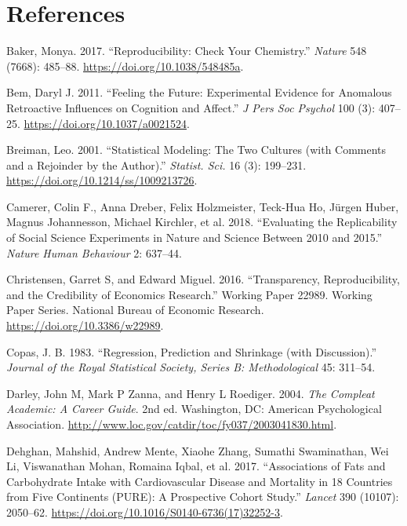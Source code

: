 \documentclass[
  12pt,
]{book}
\newlength{\cslhangindent}
\newlength{\cslentryspacingunit} %
\newenvironment{CSLReferences}[2] %
 {%
  \setlength{\parindent}{0pt}
  \ifodd #1
  \let\oldpar\par
  \def\par{\hangindent=\cslhangindent\oldpar}
  \fi
  \setlength{\parskip}{#2\cslentryspacingunit}
 }%
 {}
\begin{document}
\hypertarget{references}{%
\chapter{References}\label{references}}

\hypertarget{refs}{}
\begin{CSLReferences}{1}{0}
\leavevmode{}%
Baker, Monya. 2017. {``Reproducibility: Check Your Chemistry.''} \emph{Nature} 548 (7668): 485--88. \url{https://doi.org/10.1038/548485a}.

\leavevmode{}%
Bem, Daryl J. 2011. {``Feeling the Future: Experimental Evidence for Anomalous Retroactive Influences on Cognition and Affect.''} \emph{J Pers Soc Psychol} 100 (3): 407--25. \url{https://doi.org/10.1037/a0021524}.

\leavevmode{}%
Breiman, Leo. 2001. {``Statistical Modeling: The Two Cultures (with Comments and a Rejoinder by the Author).''} \emph{Statist. Sci.} 16 (3): 199--231. \url{https://doi.org/10.1214/ss/1009213726}.

\leavevmode{}%
Camerer, Colin F., Anna Dreber, Felix Holzmeister, Teck-Hua Ho, Jürgen Huber, Magnus Johannesson, Michael Kirchler, et al. 2018. {``Evaluating the Replicability of Social Science Experiments in Nature and Science Between 2010 and 2015.''} \emph{Nature Human Behaviour} 2: 637--44.

\leavevmode{}%
Christensen, Garret S, and Edward Miguel. 2016. {``Transparency, Reproducibility, and the Credibility of Economics Research.''} Working Paper 22989. Working Paper Series. National Bureau of Economic Research. \url{https://doi.org/10.3386/w22989}.

\leavevmode{}%
Copas, J. B. 1983. {``Regression, Prediction and Shrinkage (with Discussion).''} \emph{Journal of the Royal Statistical Society, Series B: Methodological} 45: 311--54.

\leavevmode{}%
Darley, John M, Mark P Zanna, and Henry L Roediger. 2004. \emph{The Compleat Academic: A Career Guide}. 2nd ed. Washington, DC: American Psychological Association. \url{http://www.loc.gov/catdir/toc/fy037/2003041830.html}.

\leavevmode{}%
Dehghan, Mahshid, Andrew Mente, Xiaohe Zhang, Sumathi Swaminathan, Wei Li, Viswanathan Mohan, Romaina Iqbal, et al. 2017. {``Associations of Fats and Carbohydrate Intake with Cardiovascular Disease and Mortality in 18 Countries from Five Continents (PURE): A Prospective Cohort Study.''} \emph{Lancet} 390 (10107): 2050--62. \url{https://doi.org/10.1016/S0140-6736(17)32252-3}.


\end{CSLReferences}
\end{document}
